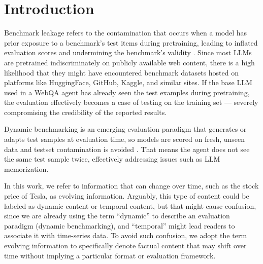 \section{Introduction}



Benchmark leakage refers to the contamination that occurs when a model has prior exposure to a benchmark's test items during pretraining, leading to inflated evaluation scores and undermining the benchmark's validity \cite{zhouDontMakeYour2023,zhuDyValDynamicEvaluation2024b}. Since most LLMs are pretrained indiscriminately on publicly available web content, there is a high likelihood that they might have encountered benchmark datasets hosted on platforms like HuggingFace, GitHub, Kaggle, and similar sites. If the base LLM used in a WebQA agent has already seen the test examples during pretraining, the evaluation effectively becomes a case of testing on the training set — severely compromising the credibility of the reported results.


Dynamic benchmarking is an emerging evaluation paradigm that generates or adapts test samples at evaluation time, so models are scored on fresh, unseen data and testset contamination is avoided \cite{zhuDyValDynamicEvaluation2024b,kielaDynabenchRethinkingBenchmarking2021a,maDynaboardEvaluationAsAServicePlatform2021,zhuDynamicEvaluationLarge2024,zhangDARGDynamicEvaluation2024,rawlesAndroidWorldDynamicBenchmarking2025}. That means the agent does not see the same test sample twice, effectively addressing issues such as LLM memorization.


In this work, we refer to information that can change over time, such as the stock price of Tesla, as evolving information. Arguably, this type of content could be labeled as dynamic content or temporal content, but that might cause confusion, since we are already using the term ``dynamic'' to describe an evaluation paradigm (dynamic benchmarking), and ``temporal'' might lead readers to associate it with time-series data. To avoid such confusion, we adopt the term evolving information to specifically denote factual content that may shift over time without implying a particular format or evaluation framework.
